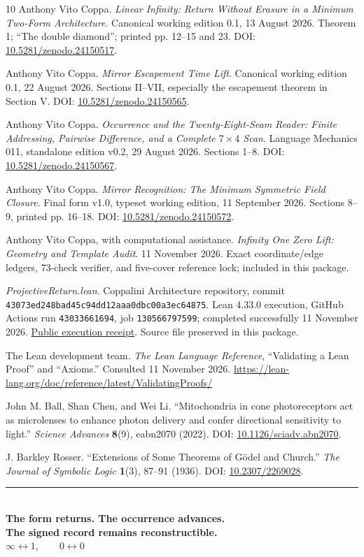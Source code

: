 \documentclass[11pt]{article}
\theoremstyle{definition}\newtheorem{definition}[theorem]{Definition}
\newcommand{\page}{\clearpage}
\begin{document}
\page
\begin{thebibliography}{10}\small
{} Anthony Vito Coppa. \emph{Linear Infinity: Return Without Erasure in a Minimum Two-Form Architecture}. Canonical working edition 0.1, 13 August 2026. Theorem 1; ``The double diamond''; printed pp. 12--15 and 23. DOI: \href{https://doi.org/10.5281/zenodo.24150517}{10.5281/zenodo.24150517}.

 Anthony Vito Coppa. \emph{Mirror Escapement Time Lift}. Canonical working edition 0.1, 22 August 2026. Sections II--VII, especially the escapement theorem in Section V. DOI: \href{https://doi.org/10.5281/zenodo.24150565}{10.5281/zenodo.24150565}.

 Anthony Vito Coppa. \emph{Occurrence and the Twenty-Eight-Seam Reader: Finite Addressing, Pairwise Difference, and a Complete $7\times4$ Scan}. Language Mechanics 011, standalone edition v0.2, 29 August 2026. Sections 1--8. DOI: \href{https://doi.org/10.5281/zenodo.24150567}{10.5281/zenodo.24150567}.

 Anthony Vito Coppa. \emph{Mirror Recognition: The Minimum Symmetric Field Closure}. Final form v1.0, typeset working edition, 11 September 2026. Sections 8--9, printed pp. 16--18. DOI: \href{https://doi.org/10.5281/zenodo.24150572}{10.5281/zenodo.24150572}.

 Anthony Vito Coppa, with computational assistance. \emph{Infinity One Zero Lift: Geometry and Template Audit}. 11 November 2026. Exact coordinate/edge ledgers, 73-check verifier, and five-cover reference lock; included in this package.

 \emph{ProjectiveReturn.lean}. Coppalini Architecture repository, commit \texttt{43073ed248\allowbreak bad45c94dd\allowbreak12aaa0dbc0\allowbreak0a3ec64875}. Lean 4.33.0 execution, GitHub Actions run \texttt{43033661694}, job \texttt{130566797599}; completed successfully 11 November 2026. \href{https://github.com/Coppalini-Architecture/coppalini-architecture/actions/runs/43033661694}{Public execution receipt}. Source file preserved in this package.

 The Lean development team. \emph{The Lean Language Reference}, ``Validating a Lean Proof'' and ``Axioms.'' Consulted 11 November 2026. \url{https://lean-lang.org/doc/reference/latest/ValidatingProofs/}

 John M. Ball, Shan Chen, and Wei Li. ``Mitochondria in cone photoreceptors act as microlenses to enhance photon delivery and confer directional sensitivity to light.'' \emph{Science Advances} \textbf{8}(9), eabn2070 (2022). DOI: \href{https://doi.org/10.1126/sciadv.abn2070}{10.1126/sciadv.abn2070}.

 J. Barkley Rosser. ``Extensions of Some Theorems of G\"odel and Church.'' \emph{The Journal of Symbolic Logic} \textbf{1}(3), 87--91 (1936). DOI: \href{https://doi.org/10.2307/2269028}{10.2307/2269028}.
\end{thebibliography}

\vfill
\begin{center}
{\color{gold}\rule{.62\linewidth}{.4pt}}\\[12pt]
\textbf{The form returns. The occurrence advances.\\The signed record remains reconstructible.}\\[12pt]
$\displaystyle\infty\longleftrightarrow1,\qquad0\longleftrightarrow0$
\end{center}
\end{document}
